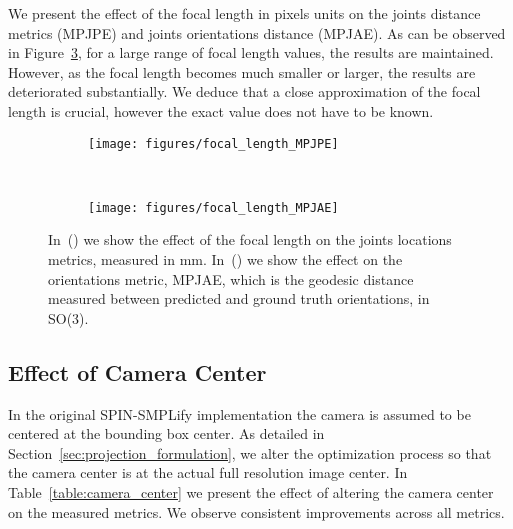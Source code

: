 \documentclass[runningheads]{llncs}
\begin{document}
We present the effect of the focal length in pixels units on the joints distance metrics (MPJPE) and joints orientations distance (MPJAE). As can be observed in Figure~\ref{fig:focal_length}, for a large range of focal length values, the results are maintained. However, as the focal length becomes much smaller or larger, the results are deteriorated substantially. We deduce that a close approximation of the focal length is crucial, however the exact value does not have to be known.

\begin{figure}
	
	\begin{subfigure}[t]{0.5\textwidth}
		\texttt{[image: figures/focal\_length\_MPJPE]}
		\centering
\caption{}
		\label{fig:focal_length_MPJPE}
	\end{subfigure}
	~
	\begin{subfigure}[t]{0.5\textwidth}
		\texttt{[image: figures/focal\_length\_MPJAE]}
		\centering
\caption{}
		\label{fig:focal_length_MPJAE}
	\end{subfigure}
	\caption{In~() we show the effect of the focal length on the joints locations metrics, measured in mm. In~() we show the effect on the orientations metric, MPJAE, which is the geodesic distance measured between predicted and ground truth orientations, in SO(3).}
	\label{fig:focal_length}
\end{figure}

\subsection{Effect of Camera Center}

In the original SPIN-SMPLify implementation the camera is assumed to be centered at the bounding box center. As detailed in Section~\ref{sec:projection_formulation}, we alter the optimization process so that the camera center is at the actual full resolution image center. In Table~\ref{table:camera_center} we present the effect of altering the camera center on the measured metrics. We observe consistent improvements across all metrics.
\end{document}
